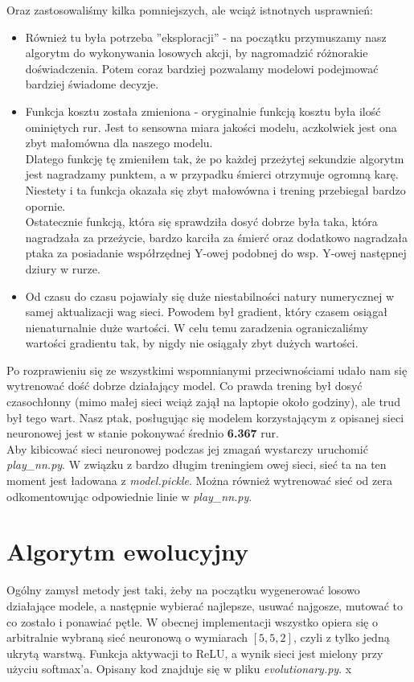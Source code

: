 \documentclass[12pt, A4]{article}
\begin{document}
	Oraz zastosowaliśmy kilka pomniejszych, ale wciąż istnotnych usprawnień:
	\begin{itemize}
	\item Również tu była potrzeba ''eksploracji'' - na początku przymuszamy nasz algorytm do wykonywania losowych akcji, by nagromadzić różnorakie doświadczenia. Potem coraz bardziej pozwalamy modelowi podejmować bardziej świadome decyzje.
	\item Funkcja kosztu została zmieniona - oryginalnie funkcją kosztu była ilość ominiętych rur. Jest to sensowna miara jakości modelu, aczkolwiek jest ona zbyt małomówna dla naszego modelu. \\
	Dlatego funkcję tę zmieniłem tak, że po każdej przeżytej sekundzie algorytm jest nagradzamy punktem, a w przypadku śmierci otrzymuje ogromną karę. Niestety i ta funkcja okazała się zbyt małowówna i trening przebiegał bardzo opornie. \\
	Ostatecznie funkcją, która się sprawdziła dosyć dobrze była taka, która nagradzała za przeżycie, bardzo karciła za śmierć oraz dodatkowo nagradzała ptaka za posiadanie współrzędnej Y-owej podobnej do wsp. Y-owej następnej dziury w rurze. 
	\item Od czasu do czasu pojawiały się duże niestabilności natury numerycznej w samej aktualizacji wag sieci. Powodem był gradient, który czasem osiągał nienaturnalnie duże wartości. W celu temu zaradzenia ograniczaliśmy wartości gradientu tak, by nigdy nie osiągały zbyt dużych wartości. 
	\end{itemize}
	Po rozprawieniu się ze wszystkimi wspomnianymi przeciwnościami udało nam się wytrenować dość dobrze działający model. Co prawda trening był dosyć czasochłonny (mimo małej sieci wciąż zajął na laptopie około godziny), ale trud był tego wart. Nasz ptak, posługując się modelem korzystającym z opisanej sieci neuronowej jest w stanie pokonywać średnio \textbf{6.367} rur. \\
	Aby kibicować sieci neuronowej podczas jej zmagań wystarczy uruchomić \textit{play\_nn.py}. W związku z bardzo długim treningiem owej sieci, sieć ta na ten moment jest ładowana z \textit{model.pickle}. Można również wytrenować sieć od zera odkomentowując odpowiednie linie w \textit{play\_nn.py}.

\section{Algorytm ewolucyjny}
Ogólny zamysł metody jest taki, żeby na początku wygenerować losowo działające modele, a następnie wybierać najlepsze, usuwać najgosze, mutować to co zostało i ponawiać pętle.
\newline
W obecnej implementacji wszystko opiera się o arbitralnie wybraną sieć neuronową o wymiarach $[5, 5, 2]$, czyli z tylko jedną ukrytą warstwą. Funkcja aktywacji to ReLU, a wynik sieci jest mielony przy użyciu softmax'a. Opisany kod znajduje się w pliku \textit{evolutionary.py}.
x
\end{document}
